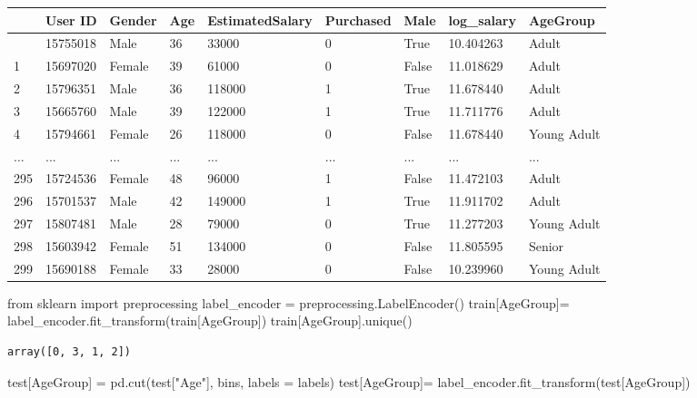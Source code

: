 \documentclass[
  letterpaper,
  DIV=11,
  numbers=noendperiod]{scrreprt}
\newenvironment{Shaded}{\begin{snugshade}}{\end{snugshade}}
\newcommand{\ImportTok}[1]{\textcolor[rgb]{0.00,0.46,0.62}{#1}}
\newcommand{\NormalTok}[1]{\textcolor[rgb]{0.00,0.23,0.31}{#1}}
\newcommand{\OperatorTok}[1]{\textcolor[rgb]{0.37,0.37,0.37}{#1}}
\newcommand{\StringTok}[1]{\textcolor[rgb]{0.13,0.47,0.30}{#1}}
\begin{document}
\begin{longtable}[]{@{}lllllllll@{}}
\toprule\noalign{}
& User ID & Gender & Age & EstimatedSalary & Purchased & Male &
log\_salary & AgeGroup \\
\midrule\noalign{}
\endhead
\bottomrule\noalign{}
\endlastfoot
0 & 15755018 & Male & 36 & 33000 & 0 & True & 10.404263 & Adult \\
1 & 15697020 & Female & 39 & 61000 & 0 & False & 11.018629 & Adult \\
2 & 15796351 & Male & 36 & 118000 & 1 & True & 11.678440 & Adult \\
3 & 15665760 & Male & 39 & 122000 & 1 & True & 11.711776 & Adult \\
4 & 15794661 & Female & 26 & 118000 & 0 & False & 11.678440 & Young
Adult \\
... & ... & ... & ... & ... & ... & ... & ... & ... \\
295 & 15724536 & Female & 48 & 96000 & 1 & False & 11.472103 & Adult \\
296 & 15701537 & Male & 42 & 149000 & 1 & True & 11.911702 & Adult \\
297 & 15807481 & Male & 28 & 79000 & 0 & True & 11.277203 & Young
Adult \\
298 & 15603942 & Female & 51 & 134000 & 0 & False & 11.805595 &
Senior \\
299 & 15690188 & Female & 33 & 28000 & 0 & False & 10.239960 & Young
Adult \\
\end{longtable}

\begin{Shaded}
\begin{Highlighting}[]
\ImportTok{from}\NormalTok{ sklearn }\ImportTok{import}\NormalTok{ preprocessing }
\NormalTok{label\_encoder }\OperatorTok{=}\NormalTok{ preprocessing.LabelEncoder() }
\NormalTok{train[}\StringTok{\textquotesingle{}AgeGroup\textquotesingle{}}\NormalTok{]}\OperatorTok{=}\NormalTok{ label\_encoder.fit\_transform(train[}\StringTok{\textquotesingle{}AgeGroup\textquotesingle{}}\NormalTok{]) }
\NormalTok{train[}\StringTok{\textquotesingle{}AgeGroup\textquotesingle{}}\NormalTok{].unique() }
\end{Highlighting}
\end{Shaded}

\begin{verbatim}
array([0, 3, 1, 2])
\end{verbatim}

\begin{Shaded}
\begin{Highlighting}[]
\NormalTok{test[}\StringTok{\textquotesingle{}AgeGroup\textquotesingle{}}\NormalTok{] }\OperatorTok{=}\NormalTok{ pd.cut(test[}\StringTok{"Age"}\NormalTok{], bins, labels }\OperatorTok{=}\NormalTok{ labels)}
\NormalTok{test[}\StringTok{\textquotesingle{}AgeGroup\textquotesingle{}}\NormalTok{]}\OperatorTok{=}\NormalTok{ label\_encoder.fit\_transform(test[}\StringTok{\textquotesingle{}AgeGroup\textquotesingle{}}\NormalTok{]) }
\end{Highlighting}
\end{Shaded}
\end{document}
